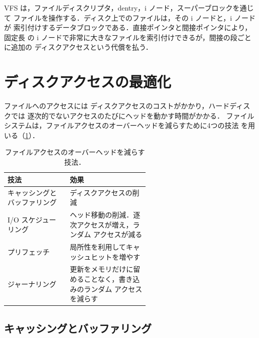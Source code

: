 \documentclass[../main.tex]{subfiles}
\begin{document}
\begin{keypoint}
  VFS は，ファイルディスクリプタ，dentry，i ノード，スーパーブロックを通じて
  ファイルを操作する．ディスク上でのファイルは，その i ノードと，i ノードが
  索引付けするデータブロックである．直接ポインタと間接ポインタにより，固定長
  の i ノードで非常に大きなファイルを索引付けできるが，間接の段ごとに追加の
  ディスクアクセスという代償を払う．
\end{keypoint}

\section{ディスクアクセスの最適化}
\label{sec:l11-optim}

ファイルへのアクセスには%
ディスクアクセスのコストがかかり，ハードディスクでは
逐次的でないアクセスのたびにヘッドを動かす時間がかかる．
ファイルシステムは，ファイルアクセスのオーバーヘッドを減らすために4つの技法
を用いる（\cref{tab:l11-optim}）．

\begin{table}[htbp]
  \centering
  \caption{ファイルアクセスのオーバーヘッドを減らす技法．}
  \label{tab:l11-optim}
  \small
  \begin{tabular}{@{}l>{\raggedright\arraybackslash}p{0.56\linewidth}@{}}
    \toprule
    技法 & 効果 \\
    \midrule
    キャッシングとバッファリング & ディスクアクセスの削減 \\
    I/O スケジューリング & ヘッド移動の削減．逐次アクセスが増え，ランダム
      アクセスが減る \\
    プリフェッチ & 局所性を利用してキャッシュヒットを増やす \\
    ジャーナリング & 更新をメモリだけに留めることなく，書き込みのランダム
      アクセスを減らす \\
    \bottomrule
  \end{tabular}
\end{table}

\subsection{キャッシングとバッファリング}
\end{document}
